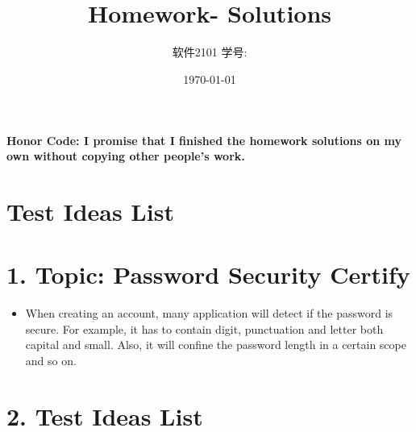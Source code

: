 \documentclass[11pt, oneside]{article}  %
\title{\vspace{-4cm}\CourseCodeName \space
        \Session \protect\\  Homework-\textbf{\Homework} Solutions}
\author{软件2101 \Name \space 学号: \SID}
\date{\today}
\begin{document}
\maketitle

\textbf{Honor Code: I promise that I finished the homework solutions on my own without copying other people's work.}

\section*{Test Ideas List}

\section*{1. Topic: Password Security Certify}

    \begin{itemize} 
        \item When creating an account, many application will detect if the password is secure. 
            For example, it has to contain digit, punctuation and letter both capital and small. 
            Also, it will confine the password length in a certain scope and so on.
    \end{itemize}

\section*{2. Test Ideas List}
\end{document}
